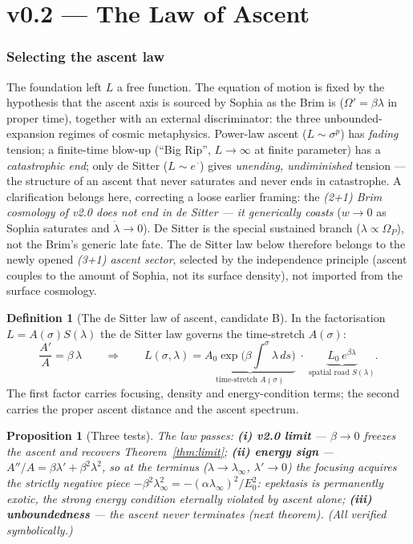 \documentclass[11pt,a4paper]{article}
\theoremstyle{plain}
\newtheorem{proposition}{Proposition}
\theoremstyle{definition}
\newtheorem{definition}{Definition}
\theoremstyle{remark}
\begin{document}
\part*{v0.2 --- The Law of Ascent}

\section{Selecting the ascent law}

The foundation left $L$ a free function. The equation of motion is fixed by the hypothesis that the
ascent axis is sourced by Sophia as the Brim is ($\Omega'=\beta\lambda$ in proper time), together with
an external discriminator: the three unbounded-expansion regimes of cosmic metaphysics. Power-law
ascent ($L\sim\sigma^p$) has \emph{fading} tension; a finite-time blow-up (``Big Rip'', $L\to\infty$
at finite parameter) has a \emph{catastrophic end}; only de Sitter ($L\sim e^{\,\cdot}$) gives
\emph{unending, undiminished} tension --- the structure of an ascent that never saturates and never
ends in catastrophe. A clarification belongs here, correcting a loose earlier framing: the
\emph{(2+1) Brim cosmology of v2.0 does not end in de Sitter --- it generically coasts} ($w\to0$ as
Sophia saturates and $\dot\lambda\to0$). De Sitter is the special sustained branch ($\lambda\propto
\Omega_P$), not the Brim's generic late fate. The de Sitter law below therefore belongs to the newly
opened \emph{(3+1) ascent sector}, selected by the independence principle (ascent couples to the
amount of Sophia, not its surface density), not imported from the surface cosmology.

\begin{definition}[The de Sitter law of ascent, candidate B]\label{def:ascent}
In the factorisation $L=A(\sigma)S(\lambda)$ the de Sitter law governs the time-stretch $A(\sigma)$:
\begin{equation}
\boxed{\;\frac{A'}{A}=\beta\,\lambda\qquad\Longrightarrow\qquad
L(\sigma,\lambda)=\underbrace{A_0\exp\!\Big(\beta\!\int^\sigma\!\lambda\,ds\Big)}_{\text{time-stretch }A(\sigma)}\;\cdot\;\underbrace{L_0\,e^{\beta\lambda}}_{\text{spatial road }S(\lambda)}.\;}
\end{equation}
The first factor carries focusing, density and energy-condition terms; the second carries the proper
ascent distance and the ascent spectrum.
\end{definition}

\begin{proposition}[Three tests]\label{prop:tests}
The law passes: \textbf{(i) v2.0 limit} --- $\beta\to0$ freezes the ascent and recovers
Theorem~\ref{thm:limit}; \textbf{(ii) energy sign} --- $A''/A=\beta\lambda'+\beta^2\lambda^2$, so at
the terminus ($\lambda\to\lambda_\infty$, $\lambda'\to0$) the focusing acquires the strictly negative
piece $-\beta^2\lambda_\infty^2=-(\alpha\lambda_\infty)^2/E_0^2$: \emph{epektasis is permanently
exotic}, the strong energy condition eternally violated by ascent alone; \textbf{(iii) unboundedness}
--- the ascent never terminates (next theorem). (All verified symbolically.)
\end{proposition}
\end{document}
